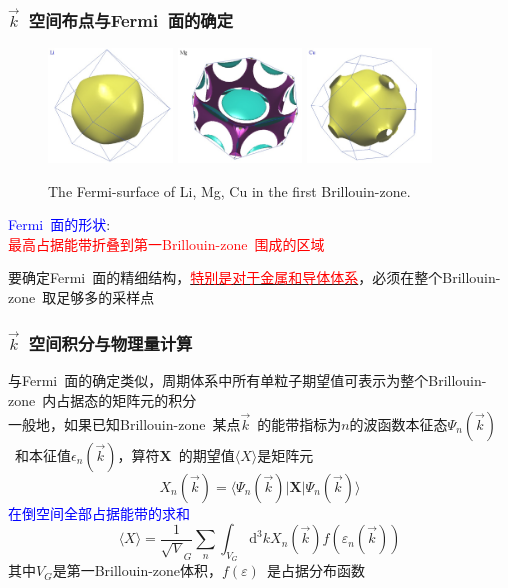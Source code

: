 {\frame
{
	\frametitle{$\vec k$~空间布点与\textrm{Fermi~}面的确定}
\begin{figure}[h!]
\centering
\vspace*{-0.15in}
\includegraphics[height=1.2in,width=1.3in,viewport=0 0 110 100,clip]{Figures/FS-Li.jpg}
\includegraphics[height=1.2in,width=1.3in,viewport=0 0 110 100,clip]{Figures/FS-Mg.jpg}
\includegraphics[height=1.2in,width=1.3in,viewport=0 0 110 100,clip]{Figures/FS-Cu.jpg}
\caption{\tiny \textrm{The Fermi-surface of Li, Mg, Cu in the first Brillouin-zone.}}%
\label{Brillouin-Band-Fermi}
\end{figure} 
\textcolor{blue}{\textrm{Fermi~}面的形状}:\\
\textcolor{red}{最高占据能带折叠到第一\textrm{Brillouin-zone~}围成的区域}

\vspace{10pt}
要确定\textrm{Fermi~}面的精细结构，\underline{\textcolor{red}{特别是对于金属和导体体系}}，必须在整个\textrm{Brillouin-zone~}取足够多的采样点
}

\frame
{
\frametitle{$\vec k$~空间积分与物理量计算}
与\textrm{Fermi~}面的确定类似，周期体系中所有单粒子期望值可表示为整个\textrm{Brillouin-zone~}内占据态的矩阵元的积分\\

一般地，如果已知\textrm{Brillouin-zone~}某点$\vec k$~的能带指标为$n$的波函数本征态$\Psi_n(\vec k)$~和本征值$\epsilon_n(\vec k)$，算符$\mathbf{X}$~的期望值$\langle X \rangle$是矩阵元
\begin{displaymath}
	X_n(\vec k)=\langle\Psi_n(\vec k)|\mathbf{X}|\Psi_n(\vec k)\rangle 
\end{displaymath}
\textcolor{blue}{在倒空间全部占据能带的求和}
\begin{displaymath}
	\langle X\rangle=\dfrac1{\sqrt V_G}\sum_n\int_{V_G}\mathrm{d}^3kX_n(\vec k)f(\varepsilon_n(\vec k))
\end{displaymath}
其中$V_G$是第一\textrm{Brillouin-zone}体积，$f(\varepsilon)$~是占据分布函数

}}
